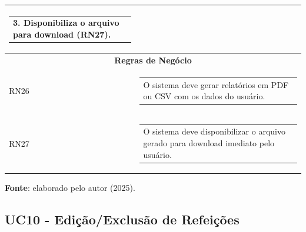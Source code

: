 \begin{longtable}[c]{|p{}|p{}|}
  \begin{tabular}[c]{@{}p{}@{}}3. Disponibiliza o arquivo para download (RN27).\end{tabular} \\ \hline
\multicolumn{2}{|c|}{\textbf{Regras de Negócio}} \\ \hline
\multicolumn{1}{|p{0.48\textwidth}|}{RN26} &
  \begin{tabular}[c]{@{}p{}@{}}O sistema deve gerar relatórios em PDF ou CSV com os dados do usuário.\end{tabular} \\ \hline
\multicolumn{1}{|p{0.48\textwidth}|}{RN27} &
  \begin{tabular}[c]{@{}p{}@{}}O sistema deve disponibilizar o arquivo gerado para download imediato pelo usuário.\end{tabular} \\ \hline
\end{longtable}
\begin{center}
    \small{\textbf{Fonte}: elaborado pelo autor (2025).}
\end{center}


\subsection{UC10 - Edição/Exclusão de Refeições}

